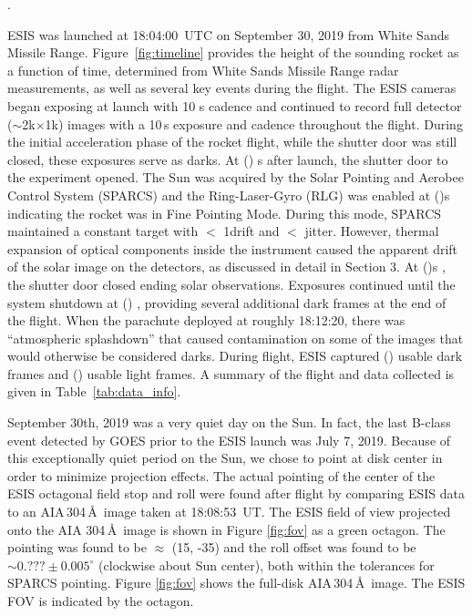 . 

		ESIS was launched at 18:04:00~UTC  on September 30, 2019 \rts{\dateMission} from White Sands Missile Range.  Figure~\ref{fig:timeline} provides the height of the sounding rocket as a function of time, determined from White Sands Missile Range radar measurements, as well as several key events during the flight.  The ESIS cameras began exposing at launch with 10 s cadence and continued to record full detector ($\sim$2k$\times$1k) images with a 10\,s exposure and cadence throughout the flight. During the initial acceleration phase of the rocket flight, while the shutter door was still closed, these exposures serve as darks.  At () s \rts{\timeMissionShutterOpen} after launch, the shutter door to the experiment opened.  The Sun was acquired by the Solar Pointing and Aerobee Control System (SPARCS) and the Ring-Laser-Gyro  (RLG) was enabled at ()s \rts{\timeMissionRlgEnable} indicating the rocket was in Fine Pointing Mode.  During this mode, SPARCS maintained a constant target with $<$ 1\arcsec drift and $< $ jitter.  However, thermal expansion of optical components inside the instrument caused the apparent drift of the solar image on the detectors, as discussed in detail in Section 3.  At ()s \rts{\timeMissionShutterClose}, the shutter door closed ending solar observations.  Exposures continued until the system shutdown at () , providing several additional dark frames at the end of the flight.  When the  parachute  deployed at roughly 18:12:20, there was  ``atmospheric splashdown'' that caused contamination on some of the images that would otherwise be considered darks.   During flight, ESIS captured () \rts{\numDarkFrames} usable dark frames and () \rts{\numDataFrames} usable light frames.  A summary of the flight and data collected is given in Table~\ref{tab:data_info}.
		
		September 30th, 2019 \rts{\dateMission} was a very quiet day on the Sun.  In fact, the last  B-class event detected by GOES \citep{GOES} prior to the ESIS launch was July 7, 2019.  Because of this exceptionally quiet period on the Sun, we chose to point at disk center in order to minimize projection effects.   The actual pointing of the center of the ESIS octagonal field stop and roll were found after flight by comparing ESIS  data to an AIA\,304\,\AA\ image taken at 18:08:53~UT.  The ESIS field of view projected onto the AIA 304\,\AA\ image is shown in Figure \ref{fig:fov} as a green octagon.  The pointing was found to be $\approx$ (15\arcsec, -35\arcsec) and the roll offset was found to be $\sim0.???\pm 0.005^\circ$ (clockwise about Sun center), both within the tolerances for SPARCS pointing.  Figure \ref{fig:fov} shows the full-disk AIA\,304\,\AA\ image. The ESIS FOV is indicated by the octagon.  
		
